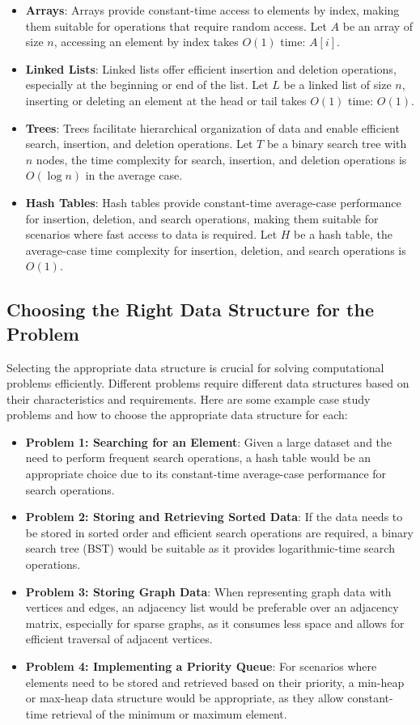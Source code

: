 \documentclass[12pt]{book} %
\begin{document}
\begin{itemize}
    \item \textbf{Arrays}: Arrays provide constant-time access to elements by index, making them suitable for operations that require random access. Let $A$ be an array of size $n$, accessing an element by index takes $O(1)$ time: $A[i]$.
    \item \textbf{Linked Lists}: Linked lists offer efficient insertion and deletion operations, especially at the beginning or end of the list. Let $L$ be a linked list of size $n$, inserting or deleting an element at the head or tail takes $O(1)$ time: $O(1)$.
    \item \textbf{Trees}: Trees facilitate hierarchical organization of data and enable efficient search, insertion, and deletion operations. Let $T$ be a binary search tree with $n$ nodes, the time complexity for search, insertion, and deletion operations is $O(\log n)$ in the average case.
    \item \textbf{Hash Tables}: Hash tables provide constant-time average-case performance for insertion, deletion, and search operations, making them suitable for scenarios where fast access to data is required. Let $H$ be a hash table, the average-case time complexity for insertion, deletion, and search operations is $O(1)$.
\end{itemize}

\subsection{Choosing the Right Data Structure for the Problem}
Selecting the appropriate data structure is crucial for solving computational problems efficiently. Different problems require different data structures based on their characteristics and requirements. Here are some example case study problems and how to choose the appropriate data structure for each:

\begin{itemize}
    \item \textbf{Problem 1: Searching for an Element}: Given a large dataset and the need to perform frequent search operations, a hash table would be an appropriate choice due to its constant-time average-case performance for search operations.
    \item \textbf{Problem 2: Storing and Retrieving Sorted Data}: If the data needs to be stored in sorted order and efficient search operations are required, a binary search tree (BST) would be suitable as it provides logarithmic-time search operations.
    \item \textbf{Problem 3: Storing Graph Data}: When representing graph data with vertices and edges, an adjacency list would be preferable over an adjacency matrix, especially for sparse graphs, as it consumes less space and allows for efficient traversal of adjacent vertices.
    \item \textbf{Problem 4: Implementing a Priority Queue}: For scenarios where elements need to be stored and retrieved based on their priority, a min-heap or max-heap data structure would be appropriate, as they allow constant-time retrieval of the minimum or maximum element.
\end{itemize}
\end{document}
